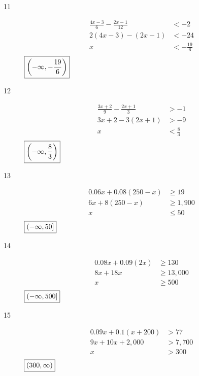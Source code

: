 \documentclass[letterpaper, landscape]{exam}
\begin{document}
\begin{description}
      \item[11]
        \begin{align*}
          \frac{4x - 3}{6} - \frac{2x - 1}{12} & < -2 \\
          2 (4x - 3) - (2x - 1)                & < -24 \\
          x                                    & < - \frac{19}{6} \\
        \end{align*}
        $\boxed{ \intoo{ -\infty, - \frac{19}{6} } }$

      \item[12]
        \begin{align*}
          \frac{3x + 2}{9} - \frac{2x + 1}{3} & > -1 \\
          3x + 2 - 3(2x + 1)                  & > -9 \\
          x                                   & < \frac{8}{3} \\
        \end{align*}
        $\boxed{ \intoo{ -\infty, \frac{8}{3} } }$

      \item[13]
        \begin{align*}
          0.06x + 0.08 (250 - x) & \geq 19 \\
          6x + 8(250 - x)        & \geq 1,900 \\
          x                      & \leq 50 \\
        \end{align*}
        $\boxed{ \intoc{ -\infty, 50 } }$

      \item[14]
        \begin{align*}
          0.08x + 0.09 (2x) & \geq 130 \\
          8x + 18x          & \geq 13,000 \\
          x                 & \geq 500 \\
        \end{align*}
        $\boxed{ \intoc{ -\infty, 500 } }$

      \item[15]
        \begin{align*}
          0.09x + 0.1 (x + 200) & > 77 \\
          9x + 10x + 2,000      & > 7,700 \\
          x                     & > 300 \\
        \end{align*}
        $\boxed{ \intoo{ 300, \infty } }$


\end{description}
\end{document}
